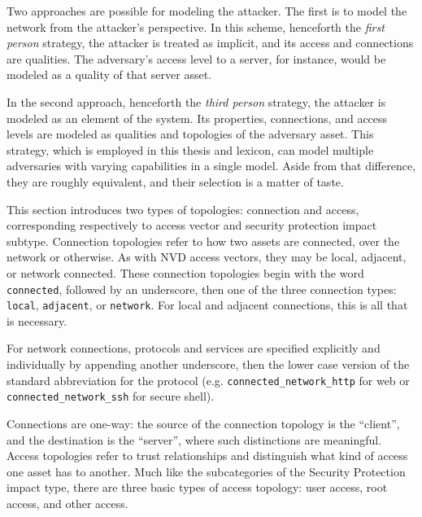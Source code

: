 Two approaches are possible for modeling the attacker. The first
is to model the network from the attacker's perspective.
In this scheme, henceforth the \emph{first person} strategy, the attacker is treated as
implicit, and its access and connections are qualities.
The adversary's access level to a server, for instance, would be modeled as a quality of
that server asset.

In the second approach, henceforth the \emph{third person} strategy, the attacker is
modeled as an element of the system. Its properties, connections,
and access levels are modeled as qualities and topologies of the adversary asset.
This strategy, which is employed in this thesis and lexicon, can model multiple
adversaries with varying capabilities in a single model. Aside from that 
difference, they are roughly equivalent, and their selection is a matter
of taste.

This section introduces two types of topologies: connection and access,
corresponding respectively to access vector and security protection impact
subtype.
Connection topologies refer to how two assets are connected, over the network or otherwise.
As with NVD access vectors, they may be local, adjacent, or network connected. These connection topologies begin with
the word \texttt{connected}, followed by an underscore, then one of the three connection
types: \texttt{local}, \texttt{adjacent}, or \texttt{network}. For local and adjacent
connections, this is all that is necessary. 

For network connections, protocols and services are specified explicitly and 
individually by appending another underscore, then the lower case version of 
the standard abbreviation for the protocol
(e.g. \texttt{connected\_network\_http} for web or \texttt{connected\_network\_ssh} for
secure shell).

Connections are one-way: the source of the connection topology is the
``client'', and the destination is
the ``server'', where such distinctions are meaningful.
Access topologies refer to trust relationships and distinguish what kind of access one
asset has
to another. Much like the subcategories of the Security Protection impact type,
there are three basic types of access topology: user access,
root access, and other access.

